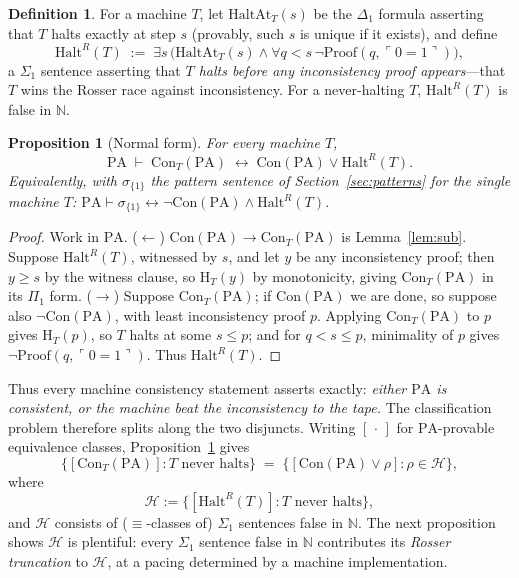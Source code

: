 \documentclass[11pt]{amsart}
\newtheorem{proposition}[theorem]{Proposition}
\theoremstyle{definition}
\newtheorem{definition}[theorem]{Definition}
\theoremstyle{remark}
\newcommand{\PA}{\mathrm{PA}}
\newcommand{\Con}{\mathrm{Con}}
\newcommand{\Pf}{\mathrm{Proof}}
\newcommand{\HT}[1]{\mathrm{H}_{#1}}
\newcommand{\godel}[1]{\ulcorner #1 \urcorner}
\newcommand{\N}{\mathbb{N}}
\begin{document}
\begin{definition}\label{def:HaltR}
For a machine $T$, let $\mathrm{HaltAt}_T(s)$ be the $\Delta_1$ formula
asserting that $T$ halts exactly at step $s$ (provably, such $s$ is
unique if it exists), and define
\[
\mathrm{Halt}^R(T) \;:=\; \exists s\,\bigl(\mathrm{HaltAt}_T(s)
   \wedge \forall q<s\,\neg\Pf(q,\godel{0{=}1})\bigr),
\]
a $\Sigma_1$ sentence asserting that \emph{$T$ halts before any
inconsistency proof appears}---that $T$ wins the Rosser race against
inconsistency. For a never-halting $T$, $\mathrm{Halt}^R(T)$ is false
in $\N$.
\end{definition}

\begin{proposition}[Normal form]\label{prop:normalform}
For \emph{every} machine $T$,
\[
\PA\;\vdash\;\Con_T(\PA)\;\longleftrightarrow\;
\Con(\PA)\vee\mathrm{Halt}^R(T).
\]
Equivalently, with $\sigma_{\{1\}}$ the pattern sentence of
Section~\ref{sec:patterns} for the single machine $T$:
$\PA\vdash\sigma_{\{1\}}\leftrightarrow
\neg\Con(\PA)\wedge\mathrm{Halt}^R(T)$.
\end{proposition}

\begin{proof}
Work in $\PA$. ($\leftarrow$) $\Con(\PA)\to\Con_T(\PA)$ is
Lemma~\ref{lem:sub}. Suppose $\mathrm{Halt}^R(T)$, witnessed by $s$, and
let $y$ be any inconsistency proof; then $y\ge s$ by the witness clause,
so $\HT{T}(y)$ by monotonicity, giving $\Con_T(\PA)$ in its $\Pi_1$ form.
($\rightarrow$) Suppose $\Con_T(\PA)$; if $\Con(\PA)$ we are done, so
suppose also $\neg\Con(\PA)$, with least inconsistency proof $p$.
Applying $\Con_T(\PA)$ to $p$ gives $\HT{T}(p)$, so $T$ halts at some
$s\le p$; and for $q<s\le p$, minimality of $p$ gives
$\neg\Pf(q,\godel{0{=}1})$. Thus $\mathrm{Halt}^R(T)$.
\end{proof}

Thus every machine consistency statement asserts exactly:
\emph{either $\PA$ is consistent, or the machine beat the inconsistency
to the tape.} The classification problem therefore splits along the two
disjuncts. Writing $[\,\cdot\,]$ for $\PA$-provable equivalence classes,
Proposition~\ref{prop:normalform} gives
\[
\{[\Con_T(\PA)] : T\text{ never halts}\}
\;=\;
\{[\Con(\PA)\vee\rho] : \rho\in\mathcal{H}\},
\]
where
\[
\mathcal{H}:=\{[\mathrm{Halt}^R(T)] : T\text{ never halts}\},
\]
and $\mathcal{H}$ consists of ($\equiv$-classes of) $\Sigma_1$ sentences
false in $\N$. The next proposition shows $\mathcal{H}$ is plentiful:
every $\Sigma_1$ sentence false in $\N$ contributes its
\emph{Rosser truncation} to $\mathcal{H}$, at a pacing determined by a
machine implementation.
\end{document}
